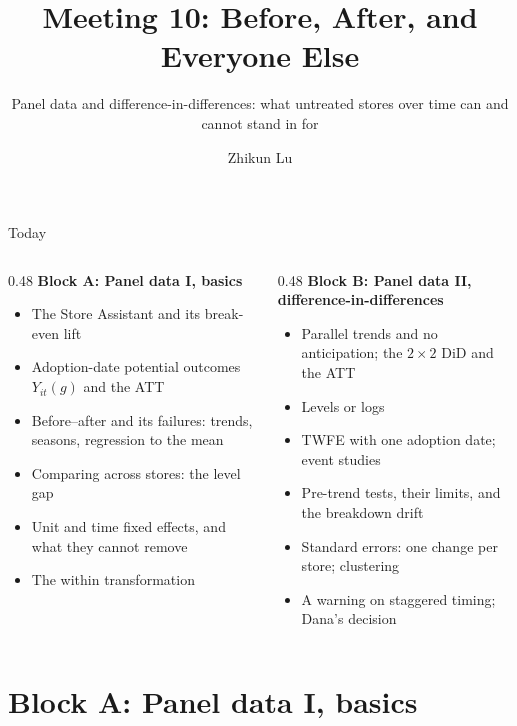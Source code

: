 \documentclass[aspectratio=169, 11pt, handout]{beamer}
\title[Meeting 10]{Meeting 10: Before, After, and Everyone Else}
\subtitle{Panel data and difference-in-differences: what untreated stores over time can and cannot stand in for}
\author{Zhikun Lu}
\date{}
\begin{document}
\begin{frame}
\titlepage
\end{frame}

\begin{frame}{Today}

\begin{columns}[T]
\begin{column}{0.48\textwidth}
\textbf{Block A: Panel data I, basics}
\begin{itemize}
  \item The Store Assistant and its break-even lift
  \item Adoption-date potential outcomes $Y_{it}(g)$ and the ATT
  \item Before--after and its failures: trends, seasons, regression to the mean
  \item Comparing across stores: the level gap
  \item Unit and time fixed effects, and what they cannot remove
  \item The within transformation
\end{itemize}
\end{column}
\begin{column}{0.48\textwidth}
\textbf{Block B: Panel data II, difference-in-differences}
\begin{itemize}
  \item Parallel trends and no anticipation; the $2 \times 2$ DiD and the ATT
  \item Levels or logs
  \item TWFE with one adoption date; event studies
  \item Pre-trend tests, their limits, and the breakdown drift
  \item Standard errors: one change per store; clustering
  \item A warning on staggered timing; Dana's decision
\end{itemize}
\end{column}
\end{columns}
\end{frame}

\section{Block A: Panel data I, basics}
\end{document}

